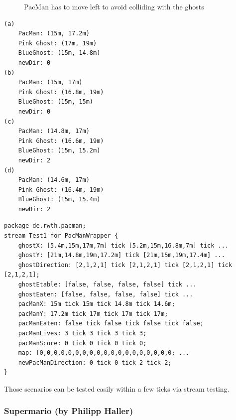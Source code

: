 \begin{figure}[!h]
	\caption{PacMan has to move left to avoid colliding with the ghosts} 
	\label{fig:pacManFleeing}
\end{figure}
\begin{lstlisting}[caption={Values for the stream test},label=lst:pmStreamValues]
(a)
	PacMan: (15m, 17.2m) 
	Pink Ghost: (17m, 19m) 
	BlueGhost: (15m, 14.8m) 
	newDir: 0
(b)	
	PacMan: (15m, 17m) 
	Pink Ghost: (16.8m, 19m) 
	BlueGhost: (15m, 15m) 
	newDir: 0
(c)	
	PacMan: (14.8m, 17m) 
	Pink Ghost: (16.6m, 19m) 
	BlueGhost: (15m, 15.2m) 
	newDir: 2
(d)	
	PacMan: (14.6m, 17m) 
	Pink Ghost: (16.4m, 19m)
	BlueGhost: (15m, 15.4m)
	newDir: 2
\end{lstlisting}

\begin{lstlisting}
package de.rwth.pacman;
stream Test1 for PacManWrapper {
	ghostX: [5.4m,15m,17m,7m] tick [5.2m,15m,16.8m,7m] tick ...
	ghostY: [21m,14.8m,19m,17.2m] tick [21m,15m,19m,17.4m] ...
	ghostDirection: [2,1,2,1] tick [2,1,2,1] tick [2,1,2,1] tick [2,1,2,1];
	ghostEtable: [false, false, false, false] tick ...
	ghostEaten: [false, false, false, false] tick ...
	pacManX: 15m tick 15m tick 14.8m tick 14.6m;
	pacManY: 17.2m tick 17m tick 17m tick 17m;
	pacManEaten: false tick false tick false tick false;
	pacManLives: 3 tick 3 tick 3 tick 3;
	pacManScore: 0 tick 0 tick 0 tick 0;
	map: [0,0,0,0,0,0,0,0,0,0,0,0,0,0,0,0,0,0,0; ...
	newPacManDirection: 0 tick 0 tick 2 tick 2;
}
\end{lstlisting}

Those scenarios can be tested easily within a few ticks via stream testing.

\subsubsection{Supermario (by Philipp Haller)}



